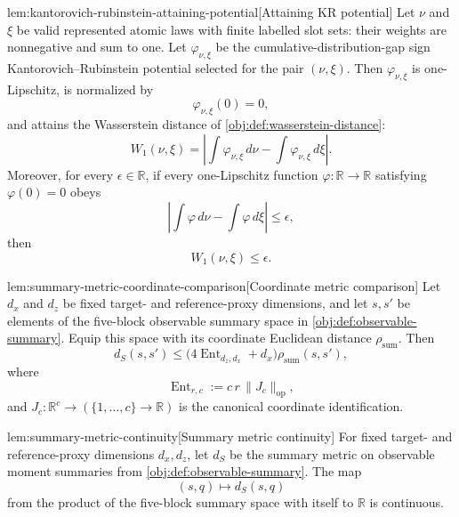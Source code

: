\begin{lemmav}{lem:kantorovich-rubinstein-attaining-potential}[Attaining KR potential]
Let \(\nu\) and \(\xi\) be valid represented atomic laws with finite labelled slot sets: their weights are nonnegative and sum to one.  Let \(\varphi_{\nu,\xi}\) be the cumulative-distribution-gap sign Kantorovich--Rubinstein potential selected for the pair \((\nu,\xi)\).  Then \(\varphi_{\nu,\xi}\) is one-Lipschitz, is normalized by
\[
\varphi_{\nu,\xi}(0)=0,
\]
and attains the Wasserstein distance of \cref{obj:def:wasserstein-distance}:
\[
W_1(\nu,\xi)
=
\left|
  \int \varphi_{\nu,\xi}\,d\nu
  -
  \int \varphi_{\nu,\xi}\,d\xi
\right|.
\]
Moreover, for every \(\epsilon\in\mathbb R\), if every one-Lipschitz function \(\varphi:\mathbb R\to\mathbb R\) satisfying \(\varphi(0)=0\) obeys
\[
\left|
  \int \varphi\,d\nu
  -
  \int \varphi\,d\xi
\right|
\le \epsilon,
\]
then
\[
W_1(\nu,\xi)\le \epsilon.
\]
\end{lemmav}

\begin{lemmav}{lem:summary-metric-coordinate-comparison}[Coordinate metric comparison]
Let \(d_x\) and \(d_z\) be fixed target- and reference-proxy dimensions, and let \(s,s'\) be elements of the five-block observable summary space in \cref{obj:def:observable-summary}. Equip this space with its coordinate Euclidean distance \(\rho_{\mathrm{sum}}\). Then
\[
d_S(s,s')
\le
\bigl(4\operatorname{Ent}_{d_z,d_x}+d_x\bigr)\rho_{\mathrm{sum}}(s,s'),
\]
where
\[
\operatorname{Ent}_{r,c}
:=
c\,r\,\|J_c\|_{\mathrm{op}},
\]
and \(J_c:\mathbb R^c\to(\{1,\ldots,c\}\to\mathbb R)\) is the canonical coordinate identification.
\end{lemmav}

\begin{lemmav}{lem:summary-metric-continuity}[Summary metric continuity]
For fixed target- and reference-proxy dimensions \(d_x,d_z\), let \(d_S\) be the summary metric on observable moment summaries from \cref{obj:def:observable-summary}. The map
\[
(s,q)\longmapsto d_S(s,q)
\]
from the product of the five-block summary space with itself to \(\mathbb R\) is continuous.
\end{lemmav}

